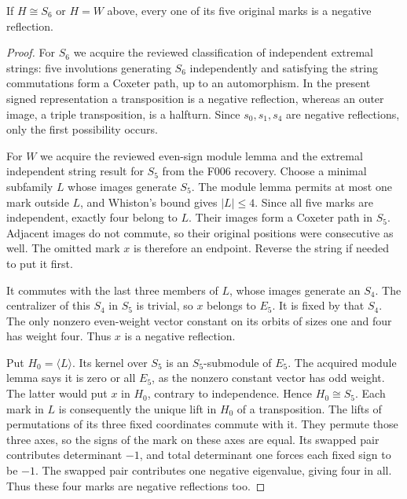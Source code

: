 \documentclass[11pt,a4paper]{article}
\newcommand{\gen}[1]{\langle#1\rangle}\newcommand{\Om}{\Omega}
\begin{document}
\begin{lemma}\label{finiteends}
If $H\cong S_6$ or $H=W$ above, every one of its five original
marks is a negative reflection.
\end{lemma}
\begin{proof}
For $S_6$ we acquire the reviewed classification of independent
extremal strings: five involutions generating $S_6$ independently and
satisfying the string commutations form a Coxeter path, up to an
automorphism. In the present signed representation a transposition
is a negative reflection, whereas an outer image, a triple
transposition, is a halfturn. Since $s_0,s_1,s_4$ are negative
reflections, only the first possibility occurs.

For $W$ we acquire the reviewed even-sign module lemma and the
extremal independent string result for $S_5$ from the F006 recovery.
Choose a minimal subfamily $L$ whose images generate $S_5$. The
module lemma permits at most one mark outside $L$, and Whiston's
bound gives $|L|\le4$. Since all five marks are independent, exactly
four belong to $L$. Their images form a Coxeter path in $S_5$.
Adjacent images do not commute, so their original positions were
consecutive as well. The omitted mark $x$ is therefore an endpoint.
Reverse the string if needed to put it first.

It commutes with the last three members of $L$, whose images generate
an $S_4$. The centralizer of this $S_4$ in $S_5$ is trivial, so
$x$ belongs to $E_5$. It is fixed by that $S_4$. The only nonzero
even-weight vector constant on its orbits of sizes one and four has
weight four. Thus $x$ is a negative reflection.

Put $H_0=\gen L$. Its kernel over $S_5$ is an $S_5$-submodule of
$E_5$. The acquired module lemma says it is zero or all $E_5$,
as the nonzero constant vector has odd weight. The latter would put
$x$ in $H_0$, contrary to independence. Hence $H_0\cong S_5$.
Each mark in $L$ is consequently the unique lift in $H_0$ of a
transposition. The lifts of permutations of its three fixed coordinates
commute with it. They permute those three axes, so the signs of the
mark on these axes are equal. Its swapped pair contributes determinant
$-1$, and total determinant one forces each fixed sign to be $-1$.
The swapped pair contributes one negative eigenvalue, giving four in
all. Thus these four marks are negative reflections too.
\end{proof}
\end{document}
